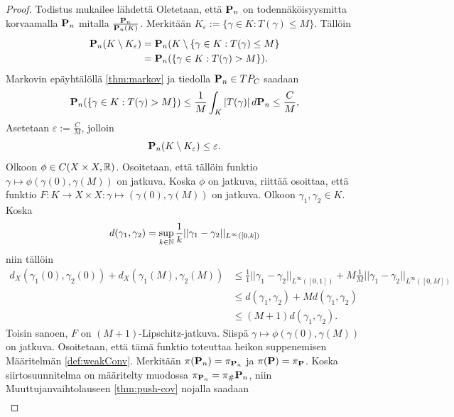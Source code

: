 \begin{proof}
    Todistus mukailee lähdettä \cite[p. 33]{OptimalTransportationNetworks} Oletetaan, että $\P_n$ on todennäköisyysmitta korvaamalla $\P_n$ mitalla $\frac{\P_n}{\P_n(K)}$. Merkitään $K_\varepsilon := \{\gamma \in K : T(\gamma) \le M\}$. Tällöin
    \begin{align*}
        \P_n(K\setminus K_\varepsilon) &= \P_n(K\setminus\{\gamma \in K: T(\gamma) \le M\} \\
        &= \P_n(\{\gamma \in K : T(\gamma) > M\}).
    \end{align*}
    Markovin epäyhtälöllä \ref{thm:markov} ja tiedolla $\P_n \in TP_C$ saadaan 
    \begin{equation*}
        \P_n(\{\gamma \in K : T(\gamma) > M\}) \le \frac{1}{M}\int_K |T(\gamma)| \, d\P_n \le \frac{C}{M},
    \end{equation*}
    Asetetaan $\varepsilon := \frac{C}{M}$, jolloin
    \begin{equation*}
        \P_n(K\setminus K_\varepsilon) \le \varepsilon.
    \end{equation*}
    Olkoon $\phi \in C(X\times X, \R)$. Osoitetaan, että tällöin funktio $\gamma \mapsto \phi(\gamma(0), \gamma(M))$ on jatkuva. Koska $\phi$ on jatkuva, riittää osoittaa, että funktio $F: K\to X \times X : \gamma \mapsto (\gamma(0), \gamma(M))$ on jatkuva. Olkoon $\gamma_1, \gamma_2 \in K$. Koska
    \begin{equation*}
        d(\gamma_1, \gamma_2) = \sup_{k\in\N} \frac{1}{k}||\gamma_1-\gamma_2||_{L^\infty([0,k])}
    \end{equation*}
    niin tällöin
    \begin{align*}
        d_X(\gamma_1(0), \gamma_2(0)) + d_X(\gamma_1(M), \gamma_2(M)) &\le \frac{1}{1}||\gamma_1-\gamma_2||_{L^\infty([0,1])} + M\frac{1}{M}||\gamma_1-\gamma_2||_{L^\infty([0,M])} \\
        &\le  d(\gamma_1, \gamma_2) + Md(\gamma_1, \gamma_2) \\
        &\le (M+1)d(\gamma_1, \gamma_2).
    \end{align*}
    Toisin sanoen, $F$ on $(M+1)$-Lipschitz-jatkuva.
    Siispä $\gamma \mapsto \phi(\gamma(0), \gamma(M))$ on jatkuva. Osoitetaan, että tämä funktio toteuttaa heikon suppenemisen Määritelmän \ref{def:weakConv}. Merkitään $\pi(\P_n) = \pi_{\P_n}$ ja $\pi(\P) = \pi_\P$.  Koska siirtosuunnitelma on määritelty muodossa $\pi_{\P_n} = \pi_\#\P_n$, niin Muuttujanvaihtolauseen \ref{thm:push-cov} nojalla saadaan
    \begin{align*}

\end{align*}
\end{proof}
